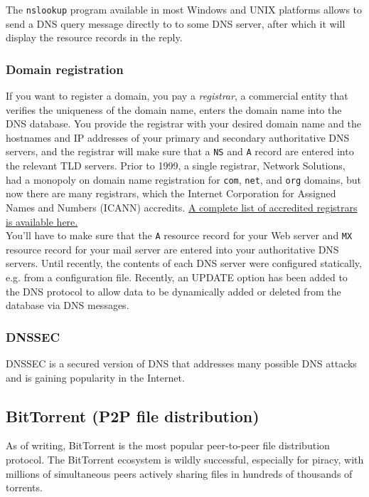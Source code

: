 \documentclass[table, xcdraw]{article}%
\begin{document}
The \texttt{nslookup} program available in most Windows and UNIX platforms allows to send a DNS query message directly to to some DNS server, after which it will display the resource records in the reply.

\subsubsection{Domain registration}

If you want to register a domain, you pay a \emph{registrar}, a commercial entity that verifies the uniqueness of the domain name, enters the domain name into the DNS database. You provide the registrar with your desired domain name and the hostnames and IP addresses of your primary and secondary authoritative DNS servers, and the registrar will make sure that a \texttt{NS} and \texttt{A} record are entered into the relevant TLD servers. Prior to 1999, a single registrar, Network Solutions, had a monopoly on domain name registration for \texttt{com}, \texttt{net}, and \texttt{org} domains, but now there are many registrars, which the Internet Corporation for Assigned Names and Numbers (ICANN) accredits. \href{http://www.internic.net}{A complete list of accredited registrars is available here.}\\
You’ll have to make sure that the \texttt{A} resource record for your Web server and \texttt{MX} resource record for your mail server are entered into your authoritative DNS servers. Until recently, the contents of each DNS server were configured statically, e.g. from a configuration file. Recently, an UPDATE option has been added to the DNS protocol to allow data to be dynamically added or deleted from the database via DNS messages.

\subsubsection{DNSSEC}

DNSSEC is a secured version of DNS that addresses many possible DNS attacks and is gaining popularity in the Internet.

\subsection{BitTorrent (P2P file distribution)}

As of writing, BitTorrent is the most popular peer-to-peer file distribution protocol. The BitTorrent ecosystem is wildly successful, especially for piracy, with millions of simultaneous peers actively sharing files in hundreds of thousands of torrents.
\end{document}

